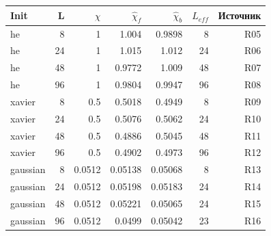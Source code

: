 \begin{tabular}{lrrrrrr}
\toprule
Init & L & $\chi$ & $\hat\chi_f$ & $\hat\chi_b$ & $L_{eff}$ & Источник \\
\midrule
he & 8 & 1 & 1.004 & 0.9898 & 8 & R05 \\
he & 24 & 1 & 1.015 & 1.012 & 24 & R06 \\
he & 48 & 1 & 0.9772 & 1.009 & 48 & R07 \\
he & 96 & 1 & 0.9804 & 0.9947 & 96 & R08 \\
xavier & 8 & 0.5 & 0.5018 & 0.4949 & 8 & R09 \\
xavier & 24 & 0.5 & 0.5076 & 0.5062 & 24 & R10 \\
xavier & 48 & 0.5 & 0.4886 & 0.5045 & 48 & R11 \\
xavier & 96 & 0.5 & 0.4902 & 0.4973 & 96 & R12 \\
gaussian & 8 & 0.0512 & 0.05138 & 0.05068 & 8 & R13 \\
gaussian & 24 & 0.0512 & 0.05198 & 0.05183 & 24 & R14 \\
gaussian & 48 & 0.0512 & 0.05221 & 0.05065 & 24 & R15 \\
gaussian & 96 & 0.0512 & 0.0499 & 0.05042 & 23 & R16 \\
\bottomrule
\end{tabular}